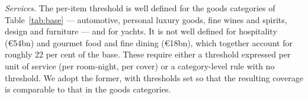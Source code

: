 \emph{Services.} The per-item threshold is well defined for the goods categories of
Table~\ref{tab:base} --- automotive, personal luxury goods, fine wines and spirits, design and
furniture --- and for yachts. It is not well defined for hospitality (\euro{}54bn) and gourmet food
and fine dining (\euro{}18bn), which together account for roughly 22 per cent of the base. These
require either a threshold expressed per unit of service (per room-night, per cover) or a
category-level rule with no threshold. We adopt the former, with thresholds set so that the
resulting coverage is comparable to that in the goods categories.